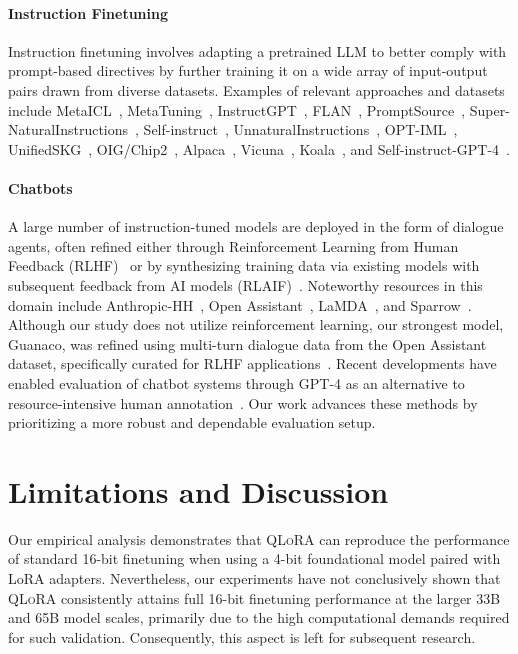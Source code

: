 \paragraph{Instruction Finetuning} Instruction finetuning involves adapting a pretrained LLM to better comply with prompt-based directives by further training it on a wide array of input-output pairs drawn from diverse datasets. Examples of relevant approaches and datasets include MetaICL~\citep{min2021metaicl}, MetaTuning~\citep{zhong2021adapting}, InstructGPT~\citep{ouyang2022training}, FLAN~\citep{wei2021finetuned,chung2022scaling}, PromptSource~\citep{bach2022promptsource}, Super-NaturalInstructions~\citep{wang2022super,sanh2021multitask}, Self-instruct~\citep{wang2022self}, UnnaturalInstructions~\citep{honovich2022unnatural}, OPT-IML~\citep{iyer2022opt}, UnifiedSKG~\citep{xie2022unifiedskg}, OIG/Chip2~\citep{laion2023}, Alpaca~\citep{alpaca}, Vicuna~\citep{vicuna2023}, Koala~\citep{koala_blogpost_2023}, and Self-instruct-GPT-4~\citep{peng2023instruction}.

\paragraph{Chatbots} A large number of instruction-tuned models are deployed in the form of dialogue agents, often refined either through Reinforcement Learning from Human Feedback (RLHF)~\citep{christiano2017deep} or by synthesizing training data via existing models with subsequent feedback from AI models (RLAIF)~\citep{bai2022constitutional}. Noteworthy resources in this domain include Anthropic-HH~\citep{askell2021general,bai2022training}, Open Assistant~\citep{kopf2023openassistant}, LaMDA~\citep{thoppilan2022lamda}, and Sparrow~\citep{glaese2022improving}. Although our study does not utilize reinforcement learning, our strongest model, Guanaco, was refined using multi-turn dialogue data from the Open Assistant dataset, specifically curated for RLHF applications~\citep{kopf2023openassistant}. Recent developments have enabled evaluation of chatbot systems through GPT-4 as an alternative to resource-intensive human annotation~\citep{vicuna2023,peng2023instruction}. Our work advances these methods by prioritizing a more robust and dependable evaluation setup.

\section{Limitations and Discussion}

Our empirical analysis demonstrates that \textsc{QLoRA} can reproduce the performance of standard 16-bit finetuning when using a 4-bit foundational model paired with LoRA adapters. Nevertheless, our experiments have not conclusively shown that \textsc{QLoRA} consistently attains full 16-bit finetuning performance at the larger 33B and 65B model scales, primarily due to the high computational demands required for such validation. Consequently, this aspect is left for subsequent research.


